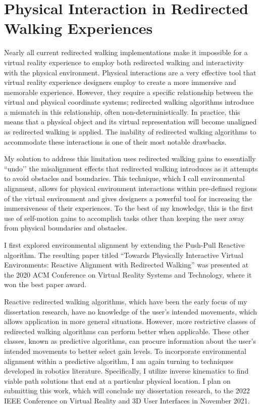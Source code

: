 \section*{Physical Interaction in Redirected Walking Experiences}
\vspace{-0.5cm}
Nearly all current redirected walking implementations make it impossible for a virtual reality experience to employ both redirected walking and interactivity with the physical environment. Physical interactions are a very effective tool that virtual reality experience designers employ to create a more immersive and memorable experience. However, they require a specific relationship between the virtual and physical coordinate systems; redirected walking algorithms introduce a mismatch in this relationship, often non-deterministically. In practice, this means that a physical object and its virtual representation will become unaligned as redirected walking is applied. The inability of redirected walking algorithms to accommodate these interactions is one of their most notable drawbacks.

My solution to address this limitation uses redirected walking gains to essentially ``undo’’ the misalignment effects that redirected walking introduces as it attempts to avoid obstacles and boundaries. This technique, which I call environmental alignment, allows for physical environment interactions within pre-defined regions of the virtual environment and gives designers a powerful tool for increasing the immersiveness of their experiences. To the best of my knowledge, this is the first use of self-motion gains to accomplish tasks other than keeping the user away from physical boundaries and obstacles.

I first explored environmental alignment by extending the Push-Pull Reactive algorithm. The resulting paper titled ``Towards Physically Interactive Virtual Environments: Reactive Alignment with Redirected Walking'' was presented at the 2020 ACM Conference on Virtual Reality Systems and Technology, where it won the best paper award.

Reactive redirected walking algorithms, which have been the early focus of my dissertation research, have no knowledge of the user’s intended movements, which allows application in more general situations. However, more restrictive classes of redirected walking algorithms can perform better when applicable. These other classes, known as predictive algorithms, can procure information about the user’s intended movements to better select gain levels. To incorporate environmental alignment within a predictive algorithm, I am again turning to techniques developed in robotics literature. Specifically, I utilize inverse kinematics to find viable path solutions that end at a particular physical location. I plan on submitting this work, which will conclude my dissertation research, to the 2022 IEEE Conference on Virtual Reality and 3D User Interfaces in November 2021.

